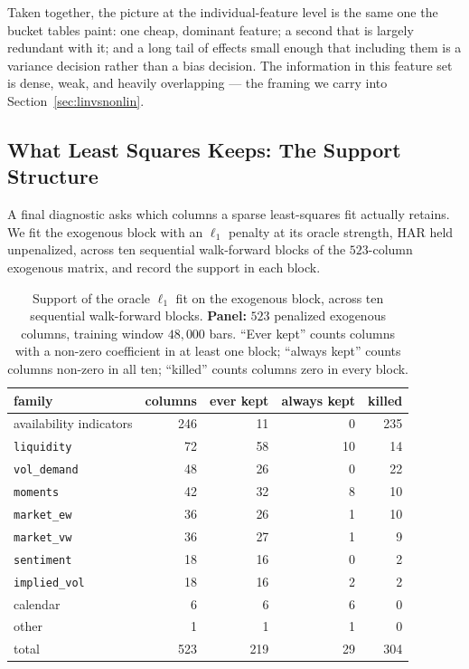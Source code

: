 Taken together, the picture at the individual-feature level is the same one the bucket
tables paint: one cheap, dominant feature; a second that is largely redundant with it; and
a long tail of effects small enough that including them is a variance decision rather than
a bias decision. The information in this feature set is dense, weak, and heavily
overlapping --- the framing we carry into Section~\ref{sec:linvsnonlin}.

\subsection{What Least Squares Keeps: The Support Structure}

A final diagnostic asks which columns a sparse least-squares fit actually retains. We fit
the exogenous block with an $\ell_1$ penalty \citep{Tibshirani1996} at its oracle strength,
HAR held unpenalized, across ten sequential walk-forward blocks of the $523$-column
exogenous matrix, and record the support in each block.

\begin{table}[H]
\centering
\caption{Support of the oracle $\ell_1$ fit on the exogenous block, across ten sequential
walk-forward blocks. \textbf{Panel:} $523$ penalized exogenous columns, training window
$48{,}000$ bars. ``Ever kept'' counts columns with a non-zero coefficient in at least one
block; ``always kept'' counts columns non-zero in all ten; ``killed'' counts columns zero
in every block.}
\label{tab:marginal_support}
\begin{tabular}{lrrrr}
\toprule
family & columns & ever kept & always kept & killed \\
\midrule
availability indicators & 246 & 11 & 0 & 235 \\
\texttt{liquidity}      & 72  & 58 & 10 & 14 \\
\texttt{vol\_demand}    & 48  & 26 & 0 & 22 \\
\texttt{moments}        & 42  & 32 & 8 & 10 \\
\texttt{market\_ew}     & 36  & 26 & 1 & 10 \\
\texttt{market\_vw}     & 36  & 27 & 1 & 9 \\
\texttt{sentiment}      & 18  & 16 & 0 & 2 \\
\texttt{implied\_vol}   & 18  & 16 & 2 & 2 \\
calendar                & 6   & 6  & 6 & 0 \\
other                   & 1   & 1  & 1 & 0 \\
\midrule
total                   & 523 & 219 & 29 & 304 \\
\bottomrule
\end{tabular}
\end{table}

